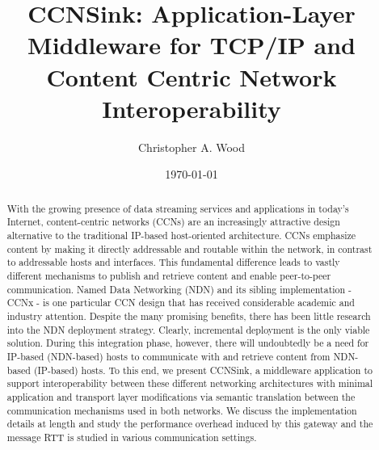 \documentclass{sigcomm}
\newcommand{\sink}{{\sf CCNSink}}
\begin{document}
\title{CCNSink: Application-Layer Middleware for TCP/IP and Content Centric Network Interoperability}

\author{
\alignauthor
Christopher A. Wood\\ %
}

\date{\today}

\maketitle
\begin{abstract}
With the growing presence of data streaming services and applications in today's Internet, content-centric networks (CCNs) are an increasingly attractive design alternative to the traditional IP-based host-oriented architecture. CCNs emphasize content by making it directly addressable and routable within the network, in contrast to addressable hosts and interfaces. This fundamental difference leads to vastly different mechanisms to publish and retrieve content and enable peer-to-peer communication. Named Data Networking (NDN) and its sibling implementation - CCNx - is one particular CCN design that has received considerable academic and industry attention. Despite the many promising benefits, there has been little research into the NDN deployment strategy. Clearly, incremental deployment is the only viable solution. During this integration phase, however, there will undoubtedly be a need for IP-based (NDN-based) hosts to communicate with and retrieve content from NDN-based (IP-based) hosts. To this end, we present  \sink, a middleware application to support interoperability between these different networking architectures with minimal application and transport layer modifications via semantic translation between the communication mechanisms used in both networks. We discuss the implementation details at length and study the performance overhead induced by this gateway and the message RTT is studied in various communication settings.
\end{abstract}



\end{document}

